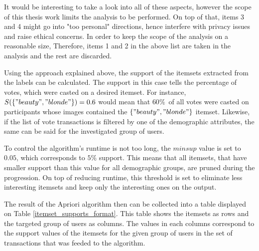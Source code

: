     It would be interesting to take a look into all of these aspects, however the scope of this thesis work limits the analysis to be performed. On top of that, items 3 and 4 might go into "too personal" directions, hence interfere with privacy issues and raise ethical concerns. In order to keep the scope of the analysis on a reasonable size, Therefore, items 1 and 2 in the above list are taken in the analysis and the rest are discarded. 
    
    Using the approach explained above, the support of the itemsets extracted from the labels can be calculated. The support in this case tells the percentage of votes, which were casted on a desired itemset. For instance, $S(\{"beauty", "blonde"\}) = 0.6$ would mean that $60 \%$ of all votes were casted on participants whose images contained the $\{"beauty", "blonde"\}$ itemset. Likewise, if the list of vote transactions is filtered by one of the demographic attributes, the same can be said for the investigated group of users. 

    To control the algorithm's runtime is not too long, the $minsup$ value is set to $0.05$, which corresponds to $5 \%$ support. This means that all itemsets, that have smaller support than this value for all demographic groups, are pruned during the progression. On top of reducing runtime, this threshold is set to eliminate less interesting itemsets and keep only the interesting ones on the output.

    The result of the Apriori algorithm then can be collected into a table displayed on Table \ref{itemset_supports_format}. This table shows the itemsets as rows and the targeted group of users as columns. The values in each columns correspond to the support values of the itemsets for the given group of users in the set of transactions that was feeded to the algorithm. 


